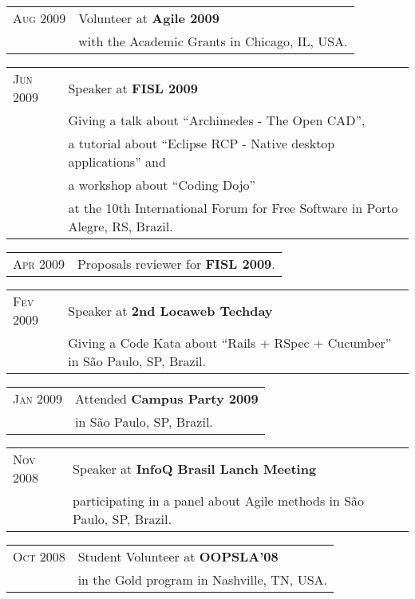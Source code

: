 \documentclass[letter,10pt]{article}
\begin{document}
\begin{tabular}{p{2.5cm}l}
  \textsc{Aug 2009} & Volunteer at \textbf{Agile 2009}\\
  & with the Academic Grants in Chicago, IL, USA.\\
\end{tabular}

\begin{tabular}{p{2.5cm}l}
  \textsc{Jun 2009} & Speaker at \textbf{FISL 2009}\\
  &Giving a talk about ``Archimedes - The Open CAD'',\\
  & a tutorial about ``Eclipse RCP - Native desktop applications'' and\\
  & a workshop about ``Coding Dojo''\\
  & at the 10th International Forum for Free Software in Porto
  Alegre, RS, Brazil.
\end{tabular}

\begin{tabular}{p{2.5cm}l}
  \textsc{Apr 2009} & Proposals reviewer for \textbf{FISL 2009}.\\
\end{tabular}

\begin{tabular}{p{2.5cm}l}
  \textsc{Fev 2009} & Speaker at \textbf{2nd Locaweb Techday}\\
  & Giving a Code Kata about ``Rails + RSpec + Cucumber'' in São Paulo, SP, Brazil.\\
\end{tabular}

\begin{tabular}{p{2.5cm}l}
  \textsc{Jan 2009} & Attended \textbf{Campus Party 2009}\\
  &in São Paulo, SP, Brazil.\\
\end{tabular}

\begin{tabular}{p{2.5cm}l}
  \textsc{Nov 2008} & Speaker at \textbf{InfoQ Brasil Lanch Meeting}\\
  & participating in a panel about Agile methods in São Paulo, SP, Brazil.\\
\end{tabular}

\begin{tabular}{p{2.5cm}l}
  \textsc{Oct 2008} & Student Volunteer at \textbf{OOPSLA'08}\\
  & in the Gold program in Nashville, TN, USA.\\
\end{tabular}
\end{document}
